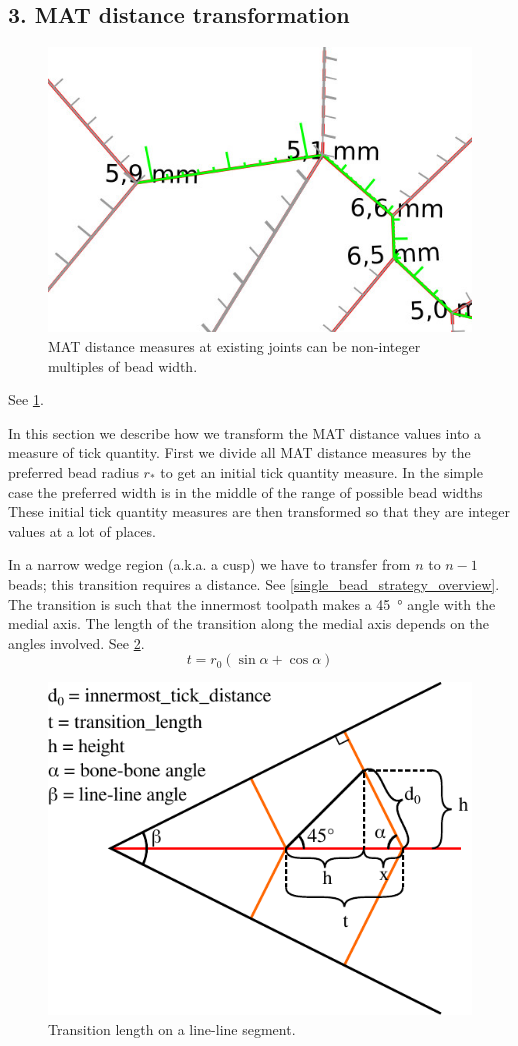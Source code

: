\subsection{3. MAT distance transformation}

\begin{figure}
\centering
\includegraphics[width=.6\columnwidth]{sources/method/rounded_dist_measures.jpg}
\caption{MAT distance measures at existing joints can be non-integer multiples of bead width.}
\label{rounded_dist_measures}
\end{figure}

See \cref{rounded_dist_measures}.

In this section we describe how we transform the MAT distance values into a measure of tick quantity.
First we divide all MAT distance measures by the preferred bead radius $r_*$ to get an initial tick quantity measure.
In the simple case the preferred width is in the middle of the range of possible bead widths
These initial tick quantity measures are then transformed so that they are integer values at a lot of places.



In a narrow wedge region (a.k.a. a cusp) we have to transfer from $n$ to $n-1$ beads; this transition requires a distance.
See \cref{single_bead_strategy_overview}.
The transition is such that the innermost toolpath makes a \SI{45}{\degree} angle with the medial axis.
The length of the transition along the medial axis depends on the angles involved.
See \cref{transition_length}.
\begin{equation}
t = r_0 (\sin \alpha + \cos \alpha)
\end{equation}

\begin{figure}[H]
\centering
\includegraphics[width=.75\columnwidth]{sources/method/transition_length_v2.pdf}
\caption{Transition length on a line-line segment.}
\label{transition_length}
\end{figure}

